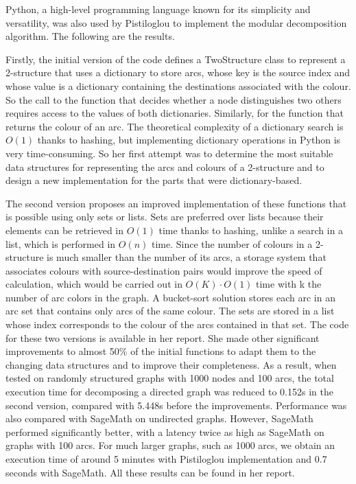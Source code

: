 Python, a high-level programming language known for its simplicity and versatility, was also used by Pistiloglou to implement the modular decomposition algorithm.
The following are the results.

Firstly, the initial version of the code defines a TwoStructure class to represent a 2-structure that uses a dictionary to store arcs, whose key is the source index and whose value is a dictionary containing the destinations associated with the colour.
So the call to the function that decides whether a node distinguishes two others requires access to the values of both dictionaries.
Similarly, for the function that returns the colour of an arc.
The theoretical complexity of a dictionary search is $O(1)$ thanks to hashing, but implementing dictionary operations in Python is very time-consuming.
So her first attempt was to determine the most suitable data structures for representing the arcs and colours of a 2-structure and to design a new implementation for the parts that were dictionary-based.

The second version proposes an improved implementation of these functions that is possible using only sets or lists.
Sets are preferred over lists because their elements can be retrieved in $O(1)$ time thanks to hashing, unlike a search in a list, which is performed in $O(n)$ time.
Since the number of colours in a 2-structure is much smaller than the number of its arcs, a storage system that associates colours with source-destination pairs would improve the speed of calculation, which would be carried out in $O(K) \cdot O(1)$ time with k the number of arc colors in the graph.
A bucket-sort solution stores each arc in an arc set that contains only arcs of the same colour.
The sets are stored in a list whose index corresponds to the colour of the arcs contained in that set.
The code for these two versions is available in her report.
She made other significant improvements to almost 50\% of the initial functions to adapt them to the changing data structures and to improve their completeness.
As a result, when tested on randomly structured graphs with 1000 nodes and 100 arcs, the total execution time for decomposing a directed graph was reduced to 0.152s in the second version, compared with 5.448s before the improvements.
Performance was also compared with SageMath on undirected graphs.
However, SageMath performed significantly better, with a latency twice as high as SageMath on graphs with 100 arcs.
For much larger graphs, such as 1000 arcs, we obtain an execution time of around 5 minutes with Pistiloglou implementation and 0.7 seconds with SageMath.
All these results can be found in her report.


